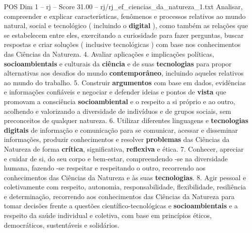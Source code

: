 \begin{textsample}{POS Dim 1 – rj – Score 31.00 – rj/rj\_ef\_ciencias\_da\_natureza\_1.txt}
Analisar, compreender e explicar características, fenômenos e processos relativos ao mundo natural, social e tecnológico ( incluindo o \textbf{digital} ), como também as relações que se estabelecem entre eles, exercitando a curiosidade para fazer perguntas, buscar respostas e criar soluções ( inclusive tecnológicas ) com base nos conhecimentos das Ciências da Natureza. 4.
Avaliar aplicações e implicações políticas, \textbf{socioambientais} e culturais da \textbf{ciência} e de suas \textbf{tecnologias} para propor alternativas aos desafios do mundo \textbf{contemporâneo}, incluindo aqueles relativos ao mundo do trabalho. 5.
Construir \textbf{argumentos} com base em dados, evidências e informações confiáveis e negociar e defender ideias e pontos de \textbf{vista} que promovam a consciência \textbf{socioambiental} e o respeito a si próprio e ao outro, acolhendo e valorizando a diversidade de indivíduos e de grupos sociais, sem preconceitos de qualquer natureza. 6.
Utilizar diferentes linguagens e \textbf{tecnologias} \textbf{digitais} de informação e comunicação para se comunicar, acessar e disseminar informações, produzir conhecimentos e resolver \textbf{problemas} das Ciências da Natureza de forma \textbf{crítica}, significativa, \textbf{reflexiva} e ética. 7.
Conhecer, apreciar e cuidar de si, do seu corpo e bem-estar, compreendendo -se na diversidade humana, fazendo -se respeitar e respeitando o outro, recorrendo aos conhecimentos das Ciências da Natureza e às suas \textbf{tecnologias}. 8.
Agir pessoal e coletivamente com respeito, autonomia, responsabilidade, flexibilidade, resiliência e determinação, recorrendo aos conhecimentos das Ciências da Natureza para tomar decisões frente a questões científico-tecnológicas e \textbf{socioambientais} e a respeito da saúde individual e coletiva, com base em princípios éticos, democráticos, sustentáveis e solidários.

\end{textsample}
